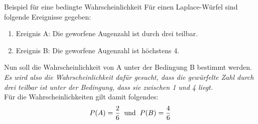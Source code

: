 \begin{bsp}{Beispiel für eine bedingte Wahrscheinlichkeit}{}
Für einen Laplace-Würfel sind folgende Ereignisse gegeben:\\
\begin{enumerate}
    \item Ereignis A: Die geworfene Augenzahl ist durch drei teilbar.
    \item Ereignis B: Die geworfene Augenzahl ist höchstens 4.
\end{enumerate}
Nun soll die Wahrscheinlichkeit von A unter der Bedingung B bestimmt werden.\\
\emph{Es wird also die Wahrscheinlichkeit dafür gesucht, dass die gewürfelte Zahl durch drei teilbar ist unter der Bedingung, dass sie zwischen 1 und 4 liegt.}\\[0.5cm]
Für die Wahrscheinlichkeiten gilt damit folgendes: $$P(A) = \dfrac{2}{6} \hspace{0.2cm} \text{und} \hspace{0.2cm} P(B) = \dfrac{4}{6} $$
\end{bsp}
